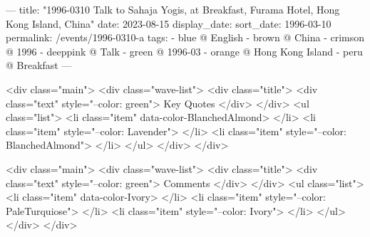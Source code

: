 ---
title: "1996-0310 Talk to Sahaja Yogis, at Breakfast, Furama Hotel, Hong Kong Island, China"
date: 2023-08-15
display_date: 
sort_date: 1996-03-10
permalink: /events/1996-0310-a
tags:
  - blue @ English
  - brown @ China
  - crimson @ 1996
  - deeppink @ Talk
  - green @ 1996-03
  - orange @ Hong Kong Island
  - peru @ Breakfast
---

<div class="main">
  <div class="wave-list">
    <div class="title">
      <div class="text" style="--color: green">
        Key Quotes
      </div>
    </div>
    <ul class="list">
        <li class="item" data-color-BlanchedAlmond>
        </li>
        <li class="item" style="--color: Lavender">
        </li>
        <li class="item" style="--color: BlanchedAlmond">
        </li>
      </ul>
  </div>
</div>

<div class="main">
  <div class="wave-list">
    <div class="title">
      <div class="text" style="--color: green">
        Comments
      </div>
    </div>
    <ul class="list">
        <li class="item" data-color-Ivory>
        </li>
        <li class="item" style="--color: PaleTurquiose">
        </li>
        <li class="item" style="--color: Ivory">
        </li>
      </ul>
  </div>
</div>